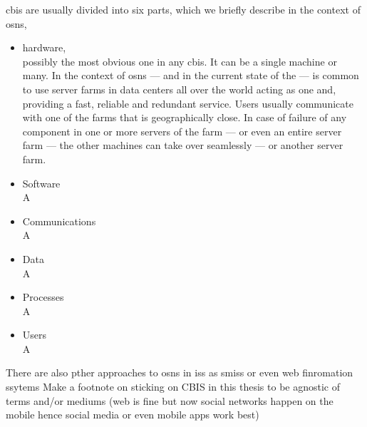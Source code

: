\documentclass[showtrims,oldfontcommands]{kthesis}
\begin{document}
\Ac{cbis} are usually divided into six parts, which we briefly describe in the context 
of \acp{osn},
\begin{itemize}
    \item hardware,\\
    possibly the most obvious one in any \ac{cbis}. It can be a single machine or 
    many. In the context of \acp{osn} --- and in the current state of the \Internet 
    --- is common to use server farms in data centers all over the world acting 
    as one and, providing a fast, reliable and redundant service. Users usually 
    communicate with one of the farms that is geographically close. In case of failure 
    of any component in one or more servers of the farm --- or even an entire server 
    farm --- the other machines can take over seamlessly --- or another server farm.
    
    \item Software\\
    A
    
    \item Communications\\
    A
    
    \item Data\\
    A
    
    \item Processes\\
    A
    
    \item Users\\
    A
    
\end{itemize}


There are also pther approaches to \acp{osn} in \acp{is} as \acp{smis} or even web 
finromation ssytems
Make a footnote on sticking on CBIS in this thesis to be agnostic of terms and/or mediums (web is fine but now social networks happen on the mobile hence social media or even mobile apps work best)


\end{document}
